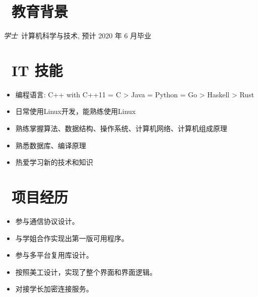 \documentclass{resume}
\begin{document}


 
\section{\faGraduationCap\  教育背景}
\textit{学士}\ 计算机科学与技术, 预计 2020 年 6 月毕业

\section{\faCogs\ IT 技能}
\begin{itemize}[parsep=0.5ex]
  \item 编程语言: C++ with C++11 = C > Java = Python = Go > Haskell > Rust
  \item 日常使用Linux开发，能熟练使用Linux
  \item 熟练掌握算法、数据结构、操作系统、计算机网络、计算机组成原理
  \item 熟悉数据库、编译原理
  \item 热爱学习新的技术和知识
\end{itemize}

\section{\faUsers\ 项目经历}
\begin{itemize}
  \item 参与通信协议设计。
  \item 与学姐合作实现出第一版可用程序。
  \item 参与多平台复用库设计。
\end{itemize}

\begin{itemize}
  \item 按照美工设计，实现了整个界面和界面逻辑。
  \item 对接学长加密连接服务。
\end{itemize}
\end{document}
